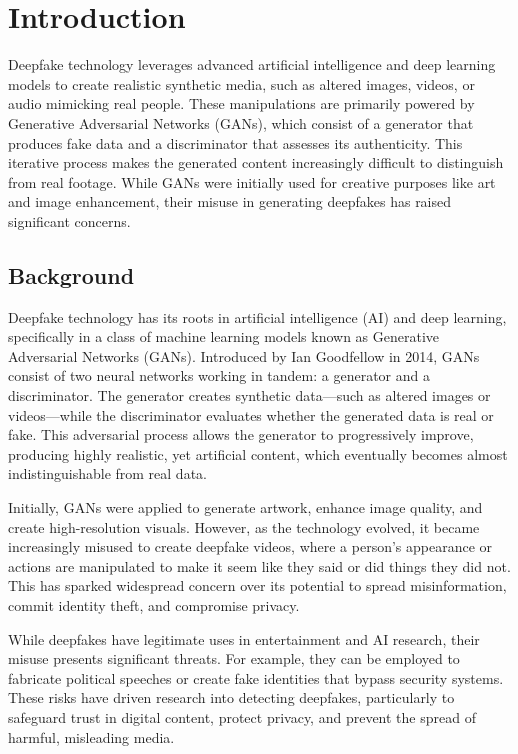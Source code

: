 \chapter{Introduction}
Deepfake technology leverages advanced artificial intelligence and deep learning models to create realistic synthetic media, such as altered images, videos, or audio mimicking real people. These manipulations are primarily powered by Generative Adversarial Networks (GANs), which consist of a generator that produces fake data and a discriminator that assesses its authenticity. This iterative process makes the generated content increasingly difficult to distinguish from real footage. While GANs were initially used for creative purposes like art and image enhancement, their misuse in generating deepfakes has raised significant concerns.

\section{Background}
Deepfake technology has its roots in artificial intelligence (AI) and deep learning, specifically in a class of machine learning models known as Generative Adversarial Networks (GANs). Introduced by Ian Goodfellow in 2014, GANs consist of two neural networks working in tandem: a generator and a discriminator. The generator creates synthetic data—such as altered images or videos—while the discriminator evaluates whether the generated data is real or fake. This adversarial process allows the generator to progressively improve, producing highly realistic, yet artificial content, which eventually becomes almost indistinguishable from real data.

\noindent Initially, GANs were applied to generate artwork, enhance image quality, and create high-resolution visuals. However, as the technology evolved, it became increasingly misused to create deepfake videos, where a person’s appearance or actions are manipulated to make it seem like they said or did things they did not. This has sparked widespread concern over its potential to spread misinformation, commit identity theft, and compromise privacy.

\noindent While deepfakes have legitimate uses in entertainment and AI research, their misuse presents significant threats. For example, they can be employed to fabricate political speeches or create fake identities that bypass security systems. These risks have driven research into detecting deepfakes, particularly to safeguard trust in digital content, protect privacy, and prevent the spread of harmful, misleading media.


